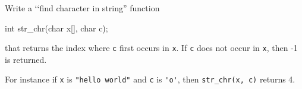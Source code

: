 Write a \lq\lq find character in string'' function
\begin{console}
int str_chr(char x[], char c);
\end{console}
that returns the index where \verb!c! first occurs in \verb!x!.
If \verb!c! does not occur in \verb!x!, then -1 is returned.

For instance if \verb!x! is \verb!"hello world"!
and \verb!c! is \verb!'o'!, then
\texttt{str\_chr(x, c)} returns 4.


